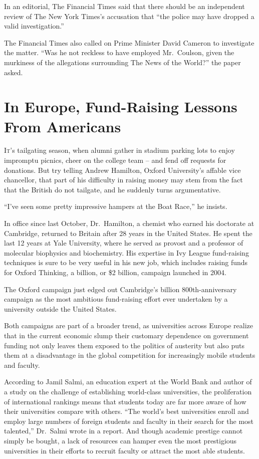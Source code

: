 ﻿\documentclass[12pt]{article}
\begin{document}
In an editorial, The Financial Times said that there should be an independent review of The New York
Times's accusation that ``the police may have dropped a valid investigation.''

The Financial Times also called on Prime Minister David Cameron to investigate the matter. ``Was he
not reckless to have employed Mr.~Coulson, given the murkiness of the allegations surrounding The
News of the World?'' the paper asked.

\pagebreak
\section{In Europe, Fund-Raising Lessons From Americans}

\lettrine{I}{t}'s tailgating season, when alumni gather in stadium parking
lots to enjoy impromptu picnics, cheer on the college team -- and fend off requests for donations.
But try telling Andrew Hamilton, Oxford University's affable vice chancellor, that part of his
difficulty in raising money may stem from the fact that the British do not tailgate, and he suddenly
turns argumentative.

``I've seen some pretty impressive hampers at the Boat Race,'' he insists.

In office since last October, Dr.~Hamilton, a chemist who earned his doctorate at Cambridge,
returned to Britain after 28 years in the United States. He spent the last 12 years at Yale
University, where he served as provost and a professor of molecular biophysics and biochemistry. His
expertise in Ivy League fund-raising techniques is sure to be very useful in his new job, which
includes raising funds for Oxford Thinking, a  billion, or \$2 billion, campaign
launched in 2004.

The Oxford campaign just edged out Cambridge's  billion 800th-anniversary campaign as
the most ambitious fund-raising effort ever undertaken by a university outside the United States.

Both campaigns are part of a broader trend, as universities across Europe realize that in the
current economic slump their customary dependence on government funding not only leaves them exposed
to the politics of austerity but also puts them at a disadvantage in the global competition for
increasingly mobile students and faculty.

According to Jamil Salmi, an education expert at the World Bank and author of a study on the
challenge of establishing world-class universities, the proliferation of international rankings
means that students today are far more aware of how their universities compare with others. ``The
world's best universities enroll and employ large numbers of foreign students and faculty in their
search for the most talented,'' Dr.~Salmi wrote in a report. And though academic prestige cannot
simply be bought, a lack of resources can hamper even the most prestigious universities in their
efforts to recruit faculty or attract the most able students.
\end{document}

